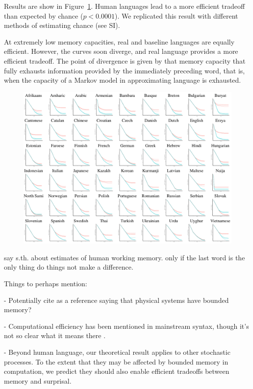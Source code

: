 \documentclass[11pt,letterpaper]{article}
\begin{document}
Results are show in Figure~\ref{fig:results}.
Human languages lead to a more efficient tradeoff than expected by chance ($p < 0.0001$).
We replicated this result with different methods of estimating chance (see SI).

At extremely low memory capacities, real and baseline languages are equally efficient.
However, the curves soon diverge, and real language provides a more efficient tradeoff.
The point of divergence is given by that memory capacity that fully exhausts information provided by the immediately preceding word, that is, when the capacity of a Markov model in approximating language is exhausted.


\begin{figure}
\includegraphics[width=\textwidth]{figures/full-results.png}
	\caption{}\label{fig:results}
\end{figure}


say s.th. about estimates of human working memory. only if the last word is the only thing do things not make a difference.


Things to perhaps mention:

- Potentially cite \cite{PhysRevLett.115.098701} as a reference saying that physical systems have bounded memory?

- Computational efficiency has been mentioned in mainstream syntax, though it's not so clear what it means there \citep{chomsky2005three,hauser2002faculty}.

- Beyond human language, our theoretical result applies to other stochastic processes. To the extent that they may be affected by bounded memory in computation, we predict they should also enable efficient tradeoffs between memory and surprisal.
\end{document}
